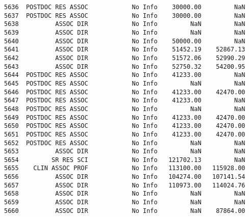 \documentclass[11pt]{article}
\begin{document}
\begin{Verbatim}[commandchars=\\\{\}]
5636  POSTDOC RES ASSOC            No Info    30000.00         NaN   
5637  POSTDOC RES ASSOC            No Info    30000.00         NaN   
5638          ASSOC DIR            No Info         NaN         NaN   
5639          ASSOC DIR            No Info         NaN         NaN   
5640          ASSOC DIR            No Info    50000.00         NaN   
5641          ASSOC DIR            No Info    51452.19    52867.13   
5642          ASSOC DIR            No Info    51572.06    52990.29   
5643          ASSOC DIR            No Info    52750.32    54200.95   
5644  POSTDOC RES ASSOC            No Info    41233.00         NaN   
5645  POSTDOC RES ASSOC            No Info         NaN         NaN   
5646  POSTDOC RES ASSOC            No Info    41233.00    42470.00   
5647  POSTDOC RES ASSOC            No Info    41233.00         NaN   
5648  POSTDOC RES ASSOC            No Info         NaN         NaN   
5649  POSTDOC RES ASSOC            No Info    41233.00    42470.00   
5650  POSTDOC RES ASSOC            No Info    41233.00    42470.00   
5651  POSTDOC RES ASSOC            No Info    41233.00    42470.00   
5652  POSTDOC RES ASSOC            No Info         NaN         NaN   
5653          ASSOC DIR            No Info         NaN         NaN   
5654         SR RES SCI            No Info   121702.13         NaN   
5655    CLIN ASSOC PROF            No Info   113100.00   115928.00   
5656          ASSOC DIR            No Info   104274.00   107141.54   
5657          ASSOC DIR            No Info   110973.00   114024.76   
5658          ASSOC DIR            No Info         NaN         NaN   
5659          ASSOC DIR            No Info         NaN         NaN   
5660          ASSOC DIR            No Info         NaN    87864.00   


\end{Verbatim}
\end{document}
